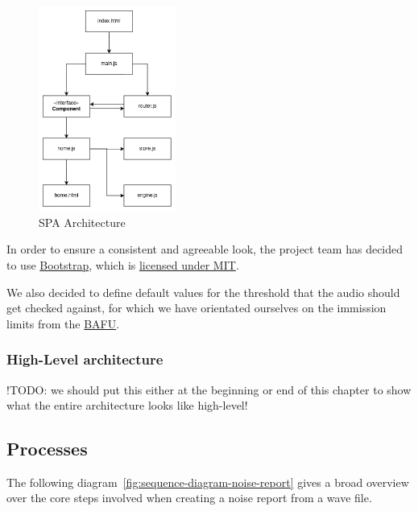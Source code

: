 \begin{figure}[H]
    \centering
    \includegraphics[width=0.4\textwidth]{../assets/spa_diagram.png}
    \caption{SPA Architecture}\label{fig:spa-architecture}
\end{figure}

In order to ensure a consistent and agreeable look, the project team has decided to use \href{https://getbootstrap.com/}{Bootstrap}, which is \href{https://github.com/twbs/bootstrap/blob/main/LICENSE}{licensed under MIT}.

We also decided to define default values for the threshold that the audio should get checked against,
for which we have orientated ourselves on the immission limits from the \href{https://www.bafu.admin.ch/bafu/de/home/themen/laerm/fachinformationen/laermbelastung/grenzwerte-fuer-laerm/belastungsgrenzwerte-fuer-laerm.html}{BAFU}.

\subsubsection{High-Level architecture}
!TODO: we should put this either at the beginning or end of this chapter to show what the entire architecture looks like high-level!

\clearpage

\subsection{Processes}
The following diagram~\ref{fig:sequence-diagram-noise-report} gives a broad overview over the core steps involved when creating a noise report from a wave file.

